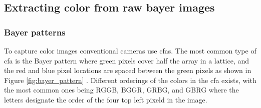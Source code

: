 \subsection{Extracting color from raw bayer images}
\subsubsection{Bayer patterns}
To capture color images conventional cameras use \glspl{cfa}.
The most common type of \gls{cfa} is the Bayer pattern where green pixels cover half the array in a lattice, and the red and blue pixel locations are spaced between the green pixels as shown in Figure \ref{fig:bayer_pattern} \cite{getreuerMalvarHeCutlerLinearImage2011}.
Different orderings of the colors in the \gls{cfa} exists, with the most common ones being RGGB, BGGR, GRBG, and GBRG where the letters designate the order of the four top left pixeld in the image.

